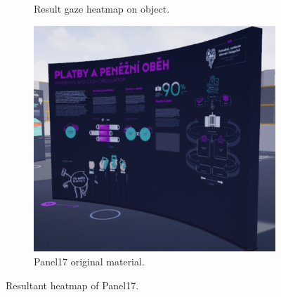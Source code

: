 \begin{figure}[!ht]
\begin{subfigure}[b]{0.335\textwidth}
        \caption{Result gaze heatmap on object.}
    \end{subfigure}
    \hfill
    \begin{subfigure}[b]{0.33\textwidth}
        \centering
        \includegraphics[width=\textwidth]{img/data/Panel17/resultant/original.png}
        \caption{Panel17 original material.}
    \end{subfigure}
    \caption{Resultant heatmap of Panel17.}
    \label{fig:Panel17-resultant-heatmaps.}
\end{figure}

